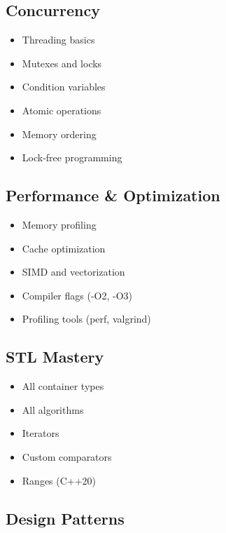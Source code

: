 \hypertarget{concurrency}{%
\subsection{Concurrency}\label{concurrency}}

\begin{itemize}
\tightlist
\item
  Threading basics
\item
  Mutexes and locks
\item
  Condition variables
\item
  Atomic operations
\item
  Memory ordering
\item
  Lock-free programming
\end{itemize}

\hypertarget{performance-optimization}{%
\subsection{Performance \&
Optimization}\label{performance-optimization}}

\begin{itemize}
\tightlist
\item
  Memory profiling
\item
  Cache optimization
\item
  SIMD and vectorization
\item
  Compiler flags (-O2, -O3)
\item
  Profiling tools (perf, valgrind)
\end{itemize}

\hypertarget{stl-mastery}{%
\subsection{STL Mastery}\label{stl-mastery}}

\begin{itemize}
\tightlist
\item
  All container types
\item
  All algorithms
\item
  Iterators
\item
  Custom comparators
\item
  Ranges (C++20)
\end{itemize}

\hypertarget{design-patterns}{%
\subsection{Design Patterns}\label{design-patterns}}

